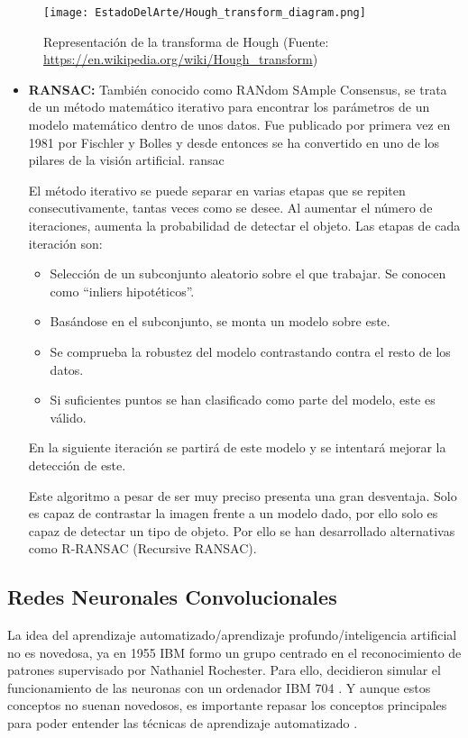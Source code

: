 \begin{figure}[ht]
	\centering
	\texttt{[image: EstadoDelArte/Hough\_transform\_diagram.png]}
	\caption[Representación de la transforma de Hough]{Representación de la transforma de Hough (Fuente: \url{https://en.wikipedia.org/wiki/Hough_transform})}
	\label{fig:Hough}
	\vspace{-5pt}
\end{figure}

\begin{itemize}
\item \textbf{RANSAC:} También conocido como RANdom SAmple Consensus, se trata de un método matemático iterativo para encontrar los parámetros de un modelo matemático dentro de unos datos. Fue publicado por primera vez en 1981 por Fischler y Bolles y desde entonces se ha convertido en uno de los pilares de la visión artificial. \acs{ransac}

El método iterativo se puede separar en varias etapas que se repiten consecutivamente, tantas veces como se desee. Al aumentar el número de iteraciones, aumenta la probabilidad de detectar el objeto. Las etapas de cada iteración son:

\begin{itemize}
\item Selección de un subconjunto aleatorio sobre el que trabajar. Se conocen como “inliers hipotéticos”.
\item  Basándose en el subconjunto, se monta un modelo sobre este.
\item Se comprueba la robustez del modelo contrastando contra el resto de los datos.
\item Si suficientes puntos se han clasificado como parte del modelo, este es válido.
\end{itemize}

En la siguiente iteración se partirá de este modelo y se intentará mejorar la detección de este.

Este algoritmo a pesar de ser muy preciso presenta una gran desventaja. Solo es capaz de contrastar la imagen frente a un modelo dado, por ello solo es capaz de detectar un tipo de objeto. Por ello se han desarrollado alternativas como R-RANSAC (Recursive RANSAC).
\end{itemize}

\subsection{Redes Neuronales Convolucionales}
\label{subsec:RedesNeuronalesConvolucionales}
La idea del aprendizaje automatizado/aprendizaje profundo/inteligencia artificial  no es novedosa, ya en 1955 IBM formo un grupo centrado en el reconocimiento de patrones supervisado por Nathaniel Rochester. Para ello, decidieron simular el funcionamiento de las neuronas con un ordenador IBM 704 \cite{Rochester}. Y aunque estos conceptos no suenan novedosos, es importante repasar los conceptos principales para poder entender las técnicas de aprendizaje automatizado \citep{alom2018history}.

